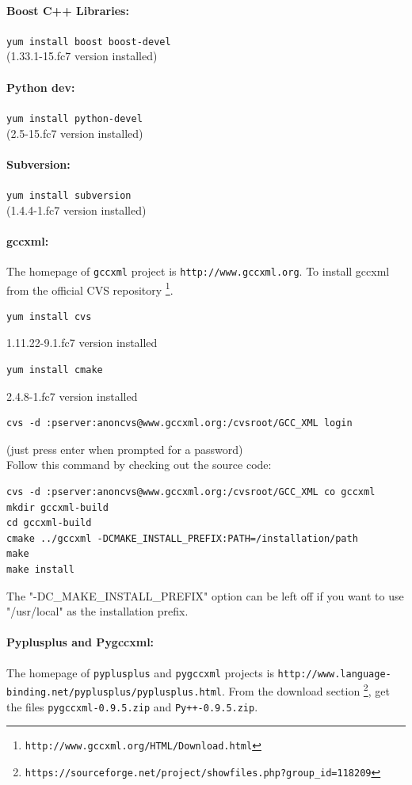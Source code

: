 \documentclass[12pt,a4paper]{article}
\begin{document}
\paragraph{Boost C++ Libraries:} {\tt yum install boost boost-devel} \\
(1.33.1-15.fc7 version installed)


\paragraph{Python dev:} {\tt yum install python-devel} \\
(2.5-15.fc7 version installed)

\paragraph{Subversion:} {\tt yum install subversion} \\
(1.4.4-1.fc7 version installed)

\paragraph{gccxml:}The homepage of {\tt gccxml} project is {\tt http://www.gccxml.org}. 
To install gccxml from the official CVS repository \footnote{\tt http://www.gccxml.org/HTML/Download.html}.

\begin{verbatim}
yum install cvs
\end{verbatim}
1.11.22-9.1.fc7 version installed

\begin{verbatim}
yum install cmake
\end{verbatim}
2.4.8-1.fc7 version installed

\begin{verbatim}
cvs -d :pserver:anoncvs@www.gccxml.org:/cvsroot/GCC_XML login
\end{verbatim}
(just press enter when prompted for a password)\\
Follow this command by checking out the source code:
\begin{verbatim}
cvs -d :pserver:anoncvs@www.gccxml.org:/cvsroot/GCC_XML co gccxml
mkdir gccxml-build
cd gccxml-build
cmake ../gccxml -DCMAKE_INSTALL_PREFIX:PATH=/installation/path
make
make install
\end{verbatim}
The "-DC\_MAKE\_INSTALL\_PREFIX" option can be left off if you want to use "/usr/local" as the installation prefix.


\paragraph{Pyplusplus and Pygccxml: }
The homepage of {\tt pyplusplus} and {\tt pygccxml} projects is 
{\tt http://www.language-binding.net/pyplusplus/pyplusplus.html}. From the
download section \footnote{\tt https://sourceforge.net/project/showfiles.php?group\_id=118209}, 
get the files {\tt pygccxml-0.9.5.zip} and {\tt Py++-0.9.5.zip}.
\end{document}
